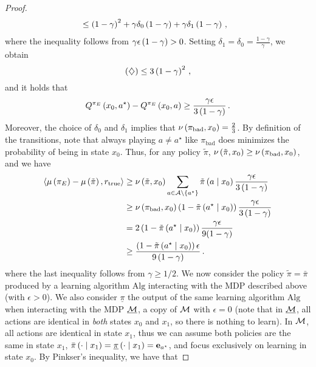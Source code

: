 \begin{proof}
\begin{align*}
        &\leq \left( 1- \gamma \right)^2 + \gamma \delta_0 \left( 1 - \gamma \right) + \gamma \delta_1 \left( 1 - \gamma \right)\,,
    \end{align*}
    where the inequality follows from $\gamma \epsilon \left( 1 - \gamma \right) > 0$. Setting $\delta_1 = \delta_0 = \frac{1 - \gamma}{\gamma}$, we obtain
    \begin{equation*}
        \left( \diamondsuit \right) \leq 3 \left( 1 - \gamma \right)^2\,,
    \end{equation*}
    and it holds that
    \begin{align*}
        Q^{\pi_E} \left( x_0, a^\star \right) - Q^{\pi_E} \left( x_0, a \right) \geq \frac{\gamma \epsilon}{3 \left( 1 - \gamma \right)}\,.
    \end{align*}
    Moreover, the choice of $\delta_0$ and $\delta_1$ implies that $\nu \left( \pi_{\mathrm{bad}}, x_0 \right) = \frac23$. By definition of the transitions, note that always playing $a \neq a^\star$ like $\pi_{\mathrm{bad}}$ does minimizes the probability of being in state $x_0$. Thus, for any policy $\tilde{\pi}$, $\nu \left( \tilde{\pi}, x_0 \right) \geq \nu \left( \pi_{\mathrm{bad}}, x_0 \right)$, and we have
    \begin{align*}
        \left\langle \mu \left( {\pi_E} \right) - \mu \left( \tilde{\pi} \right), r_{\textup{true}} \right\rangle &\geq \nu \left( \tilde{\pi}, x_0 \right) \sum_{a \in \mathcal{A} \setminus \left\{ a^\star \right\}} \tilde{\pi} \left( a \mathrel{}\middle|\mathrel{} x_0 \right) \frac{\gamma \epsilon}{3 \left( 1 - \gamma \right)} \\
        &\geq \nu \left( \pi_{\mathrm{bad}}, x_0 \right) \left( 1 - \tilde{\pi} \left( a^\star \mathrel{}\middle|\mathrel{} x_0 \right) \right) \frac{\gamma \epsilon}{3 \left( 1 - \gamma \right)} \\
        &= 2 \left( 1 - \tilde{\pi} \left( a^\star \mathrel{}\middle|\mathrel{} x_0 \right) \right) \frac{\gamma \epsilon}{9(1 - \gamma)} \\
        &\geq \frac{\left( 1 - \tilde{\pi} \left( a^\star \mathrel{}\middle|\mathrel{} x_0 \right) \right) \epsilon}{9 \left( 1 - \gamma \right)}\,.
    \end{align*}
    where the last inequality follows from $\gamma \geq 1/2$. We now consider the policy $\tilde{\pi} = \bar\pi$ produced by a learning algorithm $\mathrm{Alg}$ interacting with the MDP described above (with $\epsilon > 0$). We also consider  $\underline{\pi}$ the output of the same learning algorithm $\mathrm{Alg}$ when interacting with the MDP $\underline{\mathcal{M}}$, a copy of $\mathcal{M}$ with $\epsilon = 0$ (note that in $\underline{\mathcal{M}}$, all actions are identical in \emph{both} states $x_0$ and $x_1$, so there is nothing to learn). In $\mathcal{M}$, all actions are identical in state $x_1$, thus we can assume both policies are the same in state $x_1$, \ie $\bar\pi \left( \cdot \mathrel{}\middle|\mathrel{} x_1 \right) = \underline{\pi} \left( \cdot \mathrel{}\middle|\mathrel{} x_1 \right) = \mathbf{e}_{a^\star}$, and focus exclusively on learning in state $x_0$. By Pinkser's inequality, we have that

\end{proof}
